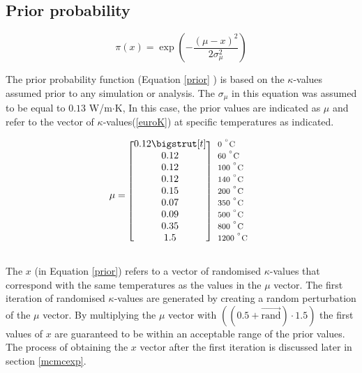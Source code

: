 	\subsection{Prior probability}
	
	\begin{equation}
	\label{prior}
	\pi(x) = \exp\left(-\frac{(\mu - x)^2}{2\sigma_{\mu}^2}\right)
	\end{equation}

	The prior probability function (Equation \ref{prior} ) is based on the $\kappa$-values assumed prior to any simulation or analysis. 
	The $\sigma_{\mu}$ in this equation was assumed to be equal to $0.13$ W/m$\cdot$K,
	In this case, the prior values are indicated as $\mu$ and refer to the vector of $\kappa$-values(\ref{euroK}) at specific temperatures as indicated.

\begin{equation}\label{euroK}
  \mu=
  \begin{blockarray}{*{1}{c} l}
    \begin{block}{[*{1}{c}]>{$\footnotesize}l<{$}}
     	0.12\bigstrut[t] & 0 $^{^\circ}\text{C}$\\
		0.12& 60 $^{^\circ}\text{C}$\\ 
		0.12& 100 $^{^\circ}\text{C}$\\ 
		0.12& 140 $^{^\circ}\text{C}$\\ 
		0.15& 200 $^{^\circ}\text{C}$\\ 
		0.07& 350 $^{^\circ}\text{C}$\\
		0.09& 500 $^{^\circ}\text{C}$\\ 
		0.35& 800 $^{^\circ}\text{C}$\\ 
		1.5& 1200 $^{^\circ}\text{C}$\\
    \end{block}
  \end{blockarray}
\end{equation}
	
The $x$ (in Equation \ref{prior}) refers to a vector of randomised $\kappa$-values that correspond with the same temperatures as the values in the $\mu$ vector.
The first iteration of randomised $\kappa$-values are generated by creating a random perturbation of the $\mu$ vector.
By multiplying the $\mu$ vector with $((0.5+\vec{\text{rand}})\cdot1.5)$ the first values of $x$ are guaranteed to be within an acceptable range of the prior values.
The process of obtaining the $x$ vector after the first iteration is discussed later in section \ref{mcmcexp}.


